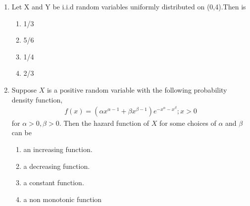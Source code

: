 \renewcommand{\theequation}{\theenumi}
\renewcommand{\thefigure}{\theenumi}
\begin{enumerate}[label=\thesection.\arabic*.,ref=\thesection.\theenumi]

\item Let X and Y be i.i.d random variables uniformly distributed on (0,4).Then  is
\begin{enumerate}
    \item 1/3
    \item 5/6
    \item 1/4
    \item 2/3
\end{enumerate}
\solution

%
\item Suppose $X$ is a positive random variable with the following probability density function,
\begin{align*}
f(x) = (\alpha x^{\alpha -1} + \beta x^{\beta-1} ) e^{-x^{\alpha}-x^{\beta}} ; x>0
\end{align*}
for $ \alpha >0, \beta >0$.
Then the hazard function of $X$ for some choices of $\alpha$ and $\beta$ can be
\begin{enumerate}
    \item an increasing function.
    \item a decreasing function.
    \item a constant function.
    \item a non monotonic function
\end{enumerate}
%
\solution

%



\end{enumerate}
